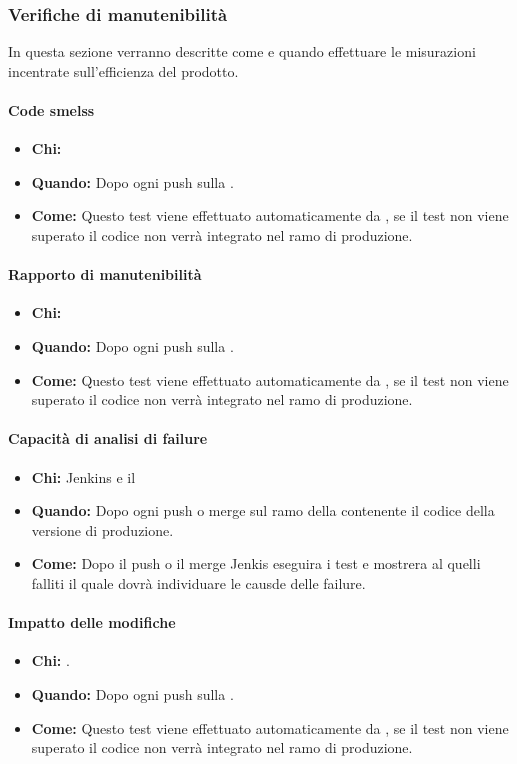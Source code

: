 \newpage
\subsubsection{Verifiche di manutenibilità}
In questa sezione verranno descritte come e quando effettuare le misurazioni incentrate sull'efficienza del prodotto.

\paragraph{Code smelss}
\begin{itemize}
\item \textbf{Chi:} 
\item \textbf{Quando:} Dopo ogni push sulla .
\item \textbf{Come:} Questo test viene effettuato automaticamente da , se il test non viene superato il codice non verrà integrato nel ramo di produzione.
\end{itemize}

\paragraph{Rapporto di manutenibilità}
\begin{itemize}
\item \textbf{Chi:} 
\item \textbf{Quando:} Dopo ogni push sulla .
\item \textbf{Come:} Questo test viene effettuato automaticamente da , se il test non viene superato il codice non verrà integrato nel ramo di produzione.
\end{itemize}

\paragraph{Capacità di analisi di failure}
\begin{itemize}
\item \textbf{Chi:} Jenkins e il \Prog
\item \textbf{Quando:} Dopo ogni push o merge sul ramo della  contenente il codice della versione di produzione.
\item \textbf{Come:} Dopo il push o il merge Jenkis eseguira i test e mostrera al \Prog quelli falliti il quale dovrà individuare le causde delle failure.
\end{itemize}

\paragraph{Impatto delle modifiche}
\begin{itemize}
\item \textbf{Chi:} .
\item \textbf{Quando:} Dopo ogni push sulla .
\item \textbf{Come:} Questo test viene effettuato automaticamente da , se il test non viene superato il codice non verrà integrato nel ramo di produzione.
\end{itemize}
